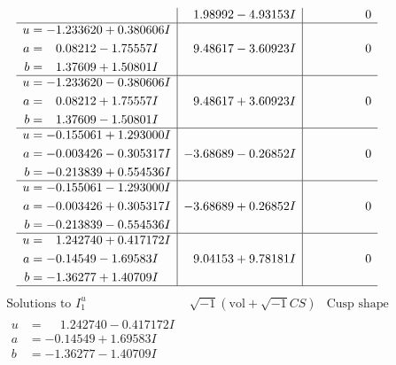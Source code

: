\documentclass[1p]{elsarticle_modified}
\theoremstyle{definition}
\newcommand{\I}{\sqrt{-1}}
\begin{document}
$$\begin{array}{c|c|c}
 & \phantom{-}1.98992 - 4.93153 I & \phantom{-0.000000 } 0 \\ \hline\begin{aligned}
u &= -1.233620 + 0.380606 I \\
a &= \phantom{-}0.08212 - 1.75557 I \\
b &= \phantom{-}1.37609 + 1.50801 I\end{aligned}
 & \phantom{-}9.48617 - 3.60923 I & \phantom{-0.000000 } 0 \\ \hline\begin{aligned}
u &= -1.233620 - 0.380606 I \\
a &= \phantom{-}0.08212 + 1.75557 I \\
b &= \phantom{-}1.37609 - 1.50801 I\end{aligned}
 & \phantom{-}9.48617 + 3.60923 I & \phantom{-0.000000 } 0 \\ \hline\begin{aligned}
u &= -0.155061 + 1.293000 I \\
a &= -0.003426 - 0.305317 I \\
b &= -0.213839 + 0.554536 I\end{aligned}
 & -3.68689 - 0.26852 I & \phantom{-0.000000 } 0 \\ \hline\begin{aligned}
u &= -0.155061 - 1.293000 I \\
a &= -0.003426 + 0.305317 I \\
b &= -0.213839 - 0.554536 I\end{aligned}
 & -3.68689 + 0.26852 I & \phantom{-0.000000 } 0 \\ \hline\begin{aligned}
u &= \phantom{-}1.242740 + 0.417172 I \\
a &= -0.14549 - 1.69583 I \\
b &= -1.36277 + 1.40709 I\end{aligned}
 & \phantom{-}9.04153 + 9.78181 I & \phantom{-0.000000 } 0\\
 \hline 
 \end{array}$$\newpage$$\begin{array}{c|c|c}  
\text{Solutions to }I^u_{1}& \I (\text{vol} + \sqrt{-1}CS) & \text{Cusp shape}\\
 \hline 
\begin{aligned}
u &= \phantom{-}1.242740 - 0.417172 I \\
a &= -0.14549 + 1.69583 I \\
b &= -1.36277 - 1.40709 I\end{aligned}

\end{array}$$
\end{document}
